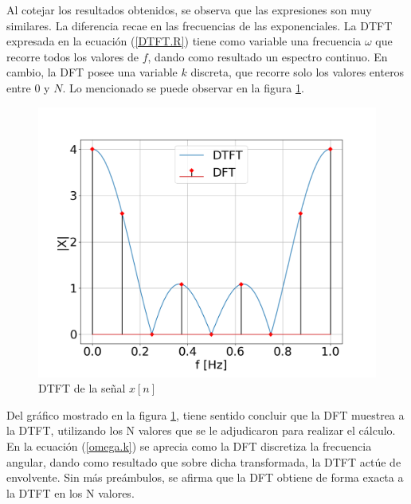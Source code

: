 \documentclass[11pt,a4paper]{article}
\begin{document}
    Al cotejar los resultados obtenidos, se observa que las expresiones son muy similares. La diferencia recae en las frecuencias de las exponenciales. La DTFT expresada en la ecuación (\ref{DTFT.R}) tiene como variable una frecuencia $\omega$ que recorre todos los valores de $f$, dando como resultado un espectro continuo. En cambio, la DFT posee una variable $k$ discreta, que recorre solo los valores enteros entre 0 y $N$. Lo mencionado se puede observar en la figura \ref{fig.3a}.
    
    
    \begin{figure}[htb]
    \centering
	\includegraphics[width=.5\textwidth]{Img/punto_3_a.png}
	\caption{DTFT de la señal $x[n]$}
	\label{fig.3a}
    \end{figure}
    
    Del gráfico mostrado en la figura \ref{fig.3a}, tiene sentido concluir que la DFT muestrea a la DTFT, utilizando los N valores que se le adjudicaron para realizar el cálculo. En la ecuación (\ref{omega.k}) se aprecia como la DFT discretiza la frecuencia angular, dando como resultado que sobre dicha transformada, la DTFT actúe de envolvente. Sin más preámbulos, se afirma que la DFT obtiene de forma exacta a la DTFT en los N valores.
    
    
\end{document}
